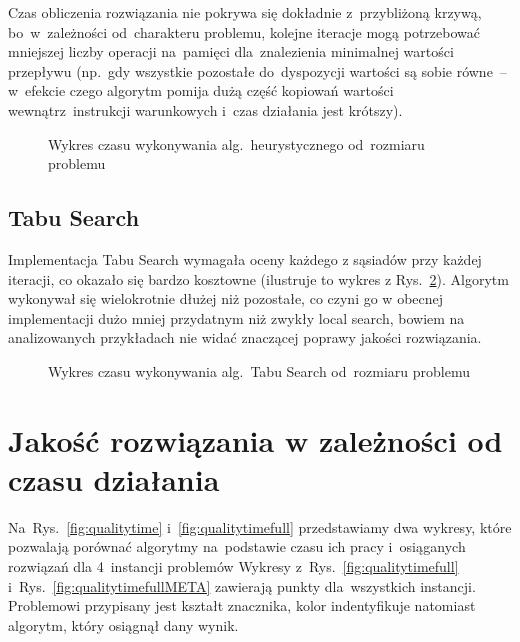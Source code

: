 \documentclass[a4paper,10pt]{article}
\begin{document}
Czas obliczenia rozwiązania nie pokrywa się dokładnie z~przybliżoną krzywą, bo~w~zależności od~charakteru problemu,
kolejne iteracje mogą potrzebować mniejszej liczby operacji na~pamięci dla~znalezienia minimalnej wartości przepływu
(np.~gdy wszystkie pozostałe do~dyspozycji wartości są sobie równe~-- w~efekcie czego algorytm pomija dużą część kopiowań
wartości wewnątrz~instrukcji warunkowych i~czas działania jest krótszy).

\begin{figure}[!htpb]
\begin{center} 

\caption{Wykres czasu wykonywania alg.~heurystycznego od~rozmiaru problemu}
\label{fig:timesizeheuristic}
\end{center}
\end{figure}

%

\subsection{Tabu Search}
Implementacja Tabu Search wymagała oceny każdego z sąsiadów przy każdej iteracji, co okazało się bardzo kosztowne (ilustruje to wykres z Rys.~\ref{fig:timesizemeta}).
Algorytm wykonywał się wielokrotnie dłużej niż pozostałe, co czyni go w obecnej implementacji dużo mniej przydatnym niż zwykły local search, bowiem na analizowanych przykładach nie widać znaczącej poprawy jakości rozwiązania.

\begin{figure}[!htpb]
\begin{center} 

\caption{Wykres czasu wykonywania alg.~Tabu Search od~rozmiaru problemu}
\label{fig:timesizemeta}
\end{center}
\end{figure}

\section{Jakość rozwiązania w zależności od czasu działania}
Na~Rys.~\ref{fig:qualitytime} i~\ref{fig:qualitytimefull} przedstawiamy dwa wykresy,
które pozwalają porównać algorytmy na~podstawie czasu ich pracy i~osiąganych rozwiązań dla 4~instancji problemów
Wykresy z~Rys.~\ref{fig:qualitytimefull} i~Rys.~\ref{fig:qualitytimefullMETA} zawierają punkty dla~wszystkich instancji. 
Problemowi przypisany jest kształt znacznika, kolor indentyfikuje natomiast algorytm, który osiągnął dany wynik.
\end{document}
